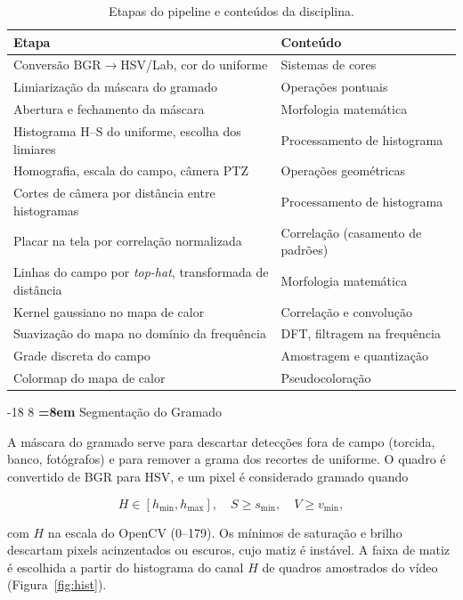 \documentclass[12pt]{article}
\makeatletter
\renewcommand\subsection{\@startsection{subsection}{2}{\z@}%
                       {-18\p@ \@plus -4\p@ \@minus -4\p@}%
                       {8\p@ \@plus 4\p@ \@minus 4\p@}%
                       {\normalfont\normalsize\bfseries\boldmath
                        \rightskip=\z@ \@plus 8em\pretolerance=10000 }}
\makeatother
\begin{document}
\begin{table}[H]
\centering
\caption{Etapas do pipeline e conteúdos da disciplina.}
\label{tab:conteudo}
\begin{tabular}{@{}ll@{}}
\toprule
\textbf{Etapa} & \textbf{Conteúdo} \\
\midrule
Conversão BGR$\rightarrow$HSV/Lab, cor do uniforme & Sistemas de cores \\
Limiarização da máscara do gramado & Operações pontuais \\
Abertura e fechamento da máscara & Morfologia matemática \\
Histograma H--S do uniforme, escolha dos limiares & Processamento de histograma \\
Homografia, escala do campo, câmera PTZ & Operações geométricas \\
Cortes de câmera por distância entre histogramas & Processamento de histograma \\
Placar na tela por correlação normalizada & Correlação (casamento de padrões) \\
Linhas do campo por \textit{top-hat}, transformada de distância & Morfologia matemática \\
Kernel gaussiano no mapa de calor & Correlação e convolução \\
Suavização do mapa no domínio da frequência & DFT, filtragem na frequência \\
Grade discreta do campo & Amostragem e quantização \\
Colormap do mapa de calor & Pseudocoloração \\
\bottomrule
\end{tabular}
\end{table}

\subsection{Segmentação do Gramado}

A máscara do gramado serve para descartar detecções fora de campo (torcida, banco,
fotógrafos) e para remover a grama dos recortes de uniforme. O quadro é convertido de
BGR para HSV, e um pixel é considerado gramado quando

\begin{equation}
H \in [h_{\min}, h_{\max}], \quad S \ge s_{\min}, \quad V \ge v_{\min},
\end{equation}

com $H$ na escala do OpenCV (0--179). Os mínimos de saturação e brilho descartam
pixels acinzentados ou escuros, cujo matiz é instável. A faixa de matiz é escolhida a
partir do histograma do canal $H$ de quadros amostrados do vídeo
(Figura~\ref{fig:hist}).
\end{document}
